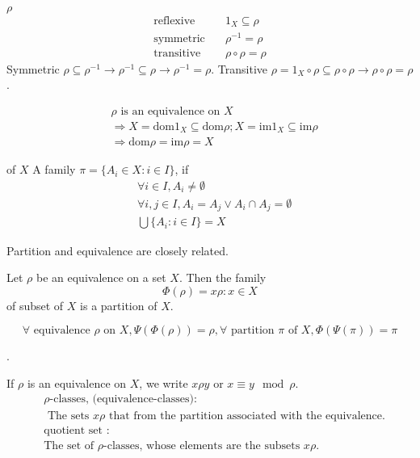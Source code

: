 \begin{Rmk}$\rho $
    \begin{align*}
        \text{reflexive } & \text{    } 1_X \subseteq \rho \\
        \text{symmetric } & \text{    } \rho^{-1}=\rho \\
        \text{transitive } & \text{    } \rho \circ \rho = \rho 
    \end{align*}
    Symmetric $\rho \subseteq \rho^{-1}\rightarrow \rho^{-1}\subseteq \rho \rightarrow \rho^{-1}=\rho $. Transitive $\rho =1_X\circ \rho \subseteq \rho \circ \rho \rightarrow \rho \circ \rho =\rho$.
\end{Rmk}

\begin{Rmk}
    \begin{align*}
        &\rho \text{ is an equivalence on }X   \\
        &\Rightarrow  X = \mathrm{dom}1_X \subseteq \mathrm{dom} \rho ; X=\mathrm{im}1_X\subseteq \mathrm{im}\rho   \\
        &\Rightarrow \mathrm{dom}\rho =\mathrm{im}\rho =X
    \end{align*}
\end{Rmk}

\begin{Def}[Partition] of $X$
    A family $\pi=\{A_i \in X:i\in I\}$, if
    \begin{align*}
        &\forall i\in I, A_i \neq \emptyset \\
        &\forall i,j \in I, A_i=A_j \vee A_i \cap A_j = \emptyset \\
        &\bigcup\{A_i: i\in I\}=X
    \end{align*}
\end{Def}

\begin{Prop}
    Partition and equivalence are closely related.

    Let $\rho $ be an equivalence on a set $X$. Then the family 
    \[\Phi(\rho )={x\rho : x\in X} \]
    of subset of $X$ is a partition of $X$.
    
    \[\forall\text{ equivalence } \rho  \text{ on } X, \Psi(\Phi(\rho ))=\rho, \forall \text{ partition } \pi \text{ of } X, \Phi(\Psi(\pi))=\pi\]
\end{Prop}

\begin{Def}.

    If $\rho$ is an equivalence on $X$, we write $x \rho y $ or $x\equiv y \mod{\rho }$.
    \begin{align*}
        &\rho\text{-classes, (equivalence-classes):}\\
        &\text{  The sets } x\rho \text{ that from the partition associated with the equivalence.} \\
        &\text{quotient set :}  \\
        &\text{The set of }\rho\text{-classes, whose elements are the subsets }x\rho.
    \end{align*}
\end{Def}

